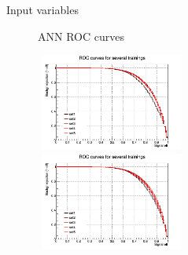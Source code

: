 \documentclass[8pt]{beamer}
\begin{document}
\begin{frame}{Input variables}
\begin{figure}[htbp]
\begin{block}{ \centering ANN ROC curves}\end{block}
\begin{minipage}[b]{.48\textwidth}
\begin{center}
\includegraphics[width=5cm, height=3.2cm]{figs/ANN_input_ST.png}
\end{center}
\end{minipage} \hfill
\begin{minipage}[b]{.48\textwidth}
\begin{center}
\includegraphics[width=5cm, height=3.2cm]{figs/ANN_input_TTbar.png}
\end{center}
\end{minipage} \hfill

\label{fig:InputVarROC}
\end{figure}
\end{frame}
\end{document}
